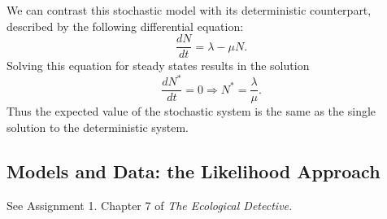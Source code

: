 We can contrast this stochastic model with its deterministic counterpart, described by the following differential equation: 
	$$ \frac{dN}{dt} = \lambda - \mu N.$$
Solving this equation for steady states results in the solution 
	$$\frac{dN^*}{dt} = 0 \Rightarrow N^* = \frac{\lambda}{\mu}. $$
Thus the expected value of the stochastic system is the same as the single solution to the deterministic system. 

\subsection{Models and Data: the Likelihood Approach}
See Assignment 1. Chapter 7 of \textit{The Ecological Detective.}

